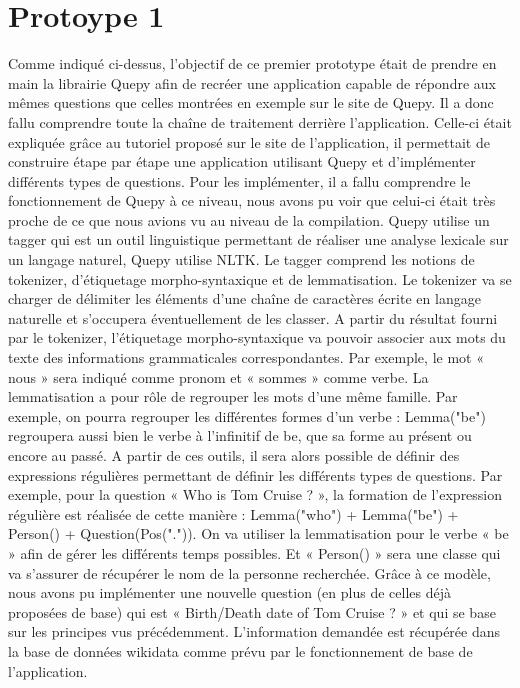\documentclass[11pt,a4paper]{article}
\begin{document}
\section*{Protoype 1}\par
Comme indiqué ci-dessus, l’objectif de ce premier prototype était de prendre en main la librairie Quepy afin de recréer une application capable de répondre aux mêmes questions que celles montrées en exemple sur le site de Quepy. Il a donc fallu comprendre toute la chaîne de traitement derrière l’application. Celle-ci était expliquée grâce au tutoriel proposé sur le site de l’application, il permettait de construire étape par étape une application utilisant Quepy et d’implémenter différents types de questions. Pour les implémenter, il a fallu comprendre le fonctionnement de Quepy à ce niveau, nous avons pu voir que celui-ci était très proche de ce que nous avions vu au niveau de la compilation. Quepy utilise un tagger qui est un outil linguistique permettant de réaliser une analyse lexicale sur un langage naturel, Quepy utilise NLTK. Le tagger comprend les notions de tokenizer, d’étiquetage morpho-syntaxique et de lemmatisation. Le tokenizer va se charger de délimiter les éléments d’une chaîne de caractères écrite en langage naturelle et s’occupera éventuellement de les classer. A partir du résultat fourni par le tokenizer, l’étiquetage morpho-syntaxique va pouvoir associer aux mots du texte des informations grammaticales correspondantes. Par exemple, le mot « nous » sera indiqué comme pronom et « sommes » comme verbe. La lemmatisation a pour rôle de regrouper les mots d’une même famille. Par exemple, on pourra regrouper les différentes formes d’un verbe : Lemma("be") regroupera aussi bien le verbe à l’infinitif de be, que sa forme au présent ou encore au passé. A partir de ces outils, il sera alors possible de définir des expressions régulières permettant de définir les différents types de questions. Par exemple, pour la question « Who is Tom Cruise ? », la formation de l’expression régulière est réalisée de cette manière : Lemma("who") + Lemma("be") + Person() + Question(Pos(".")). On va utiliser la lemmatisation pour le verbe « be » afin de gérer les différents temps possibles. Et « Person() » sera une classe qui va s’assurer de récupérer le nom de la personne recherchée. Grâce à ce modèle, nous avons pu implémenter une nouvelle question (en plus de celles déjà proposées de base) qui est « Birth/Death date of Tom Cruise ? » et qui se base sur les principes vus précédemment. L’information demandée est récupérée dans la base de données wikidata comme prévu par le fonctionnement de base de l’application.
\end{document}
